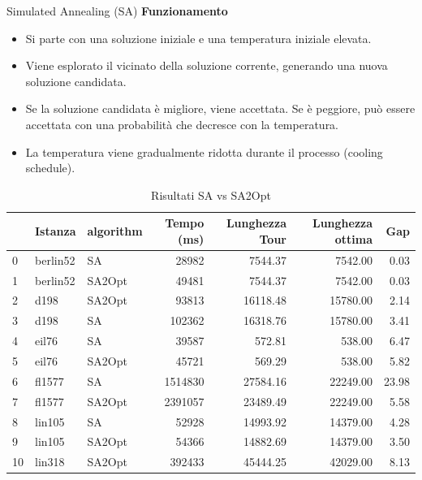 \documentclass{beamer}
\begin{document}
\begin{frame}{Simulated Annealing (SA)}
    \textbf{Funzionamento}
    \begin{itemize}
        \item Si parte con una soluzione iniziale e una temperatura iniziale elevata.
        \item Viene esplorato il vicinato della soluzione corrente, generando una nuova soluzione candidata.
        \item Se la soluzione candidata è migliore, viene accettata. Se è peggiore, può essere accettata con una probabilità che decresce con la temperatura.
        \item La temperatura viene gradualmente ridotta durante il processo (cooling schedule).
    \end{itemize}
    \begin{table}[H]
        \centering
        \caption{Risultati SA vs SA2Opt}
        \begin{tabular}{lllrrrr}
            \toprule
               & Istanza  & algorithm & Tempo (ms) & Lunghezza Tour & Lunghezza ottima & Gap   \\
            \midrule
            0  & berlin52 & SA        & 28982      & 7544.37        & 7542.00          & 0.03  \\
            1  & berlin52 & SA2Opt    & 49481      & 7544.37        & 7542.00          & 0.03  \\
            2  & d198     & SA2Opt    & 93813      & 16118.48       & 15780.00         & 2.14  \\
            3  & d198     & SA        & 102362     & 16318.76       & 15780.00         & 3.41  \\
            4  & eil76    & SA        & 39587      & 572.81         & 538.00           & 6.47  \\
            5  & eil76    & SA2Opt    & 45721      & 569.29         & 538.00           & 5.82  \\
            6  & fl1577   & SA        & 1514830    & 27584.16       & 22249.00         & 23.98 \\
            7  & fl1577   & SA2Opt    & 2391057    & 23489.49       & 22249.00         & 5.58  \\
            8  & lin105   & SA        & 52928      & 14993.92       & 14379.00         & 4.28  \\
            9  & lin105   & SA2Opt    & 54366      & 14882.69       & 14379.00         & 3.50  \\
            10 & lin318   & SA2Opt    & 392433     & 45444.25       & 42029.00         & 8.13  \\

\end{tabular}
\end{table}
\end{frame}
\end{document}
